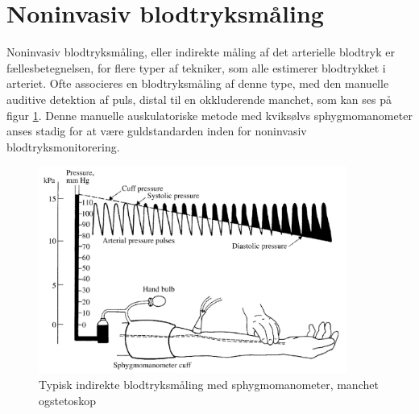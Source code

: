 \section{Noninvasiv blodtryksmåling}\label{noninvasivBloodpressureMeasurement}
Noninvasiv blodtryksmåling, eller indirekte måling af det arterielle blodtryk er fællesbetegnelsen, for flere typer af tekniker, som alle estimerer blodtrykket i arteriet. Ofte associeres en blodtryksmåling af denne type, med den manuelle auditive detektion af puls, distal til en okkluderende manchet, som kan ses på figur \ref{fig:audiotoryBloodpressureMeasurement}. Denne manuelle auskulatoriske metode med kviksølvs sphygmomanometer anses stadig for at være guldstandarden inden for noninvasiv blodtryksmonitorering.

\begin{figure}[H]
	\includegraphics[width=0.9\textwidth]{billeder/TypicalIndirectBlood-pressureMeasurement.png}
	\caption{Typisk indirekte blodtryksmåling med sphygmomanometer, manchet ogstetoskop}\label{fig:audiotoryBloodpressureMeasurement}
\end{figure}

